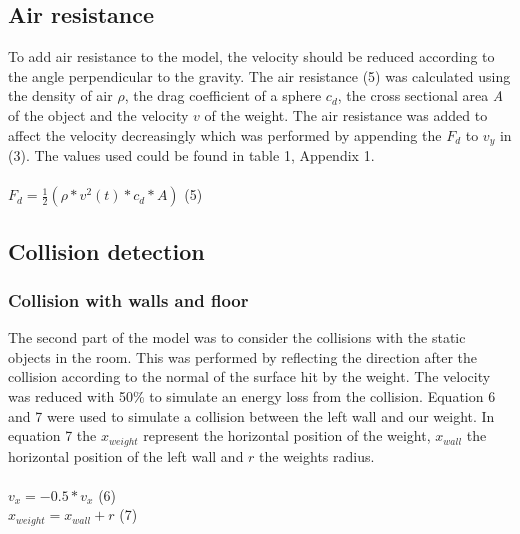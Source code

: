 \documentclass[a4paper,12pt,twoside,english]{article}
\begin{document}
 
\subsection{Air resistance}
To add air resistance to the model, the velocity should be reduced according to the angle perpendicular to the gravity. The air resistance (5) was calculated using the density of air ${\rho}$, the drag coefficient of a sphere $c_d$, the cross sectional area {\itshape A}  of the object and the velocity $v$ of the weight.
The air resistance was added to affect the velocity decreasingly which was performed by appending the $F_d$ to $v_y$ in (3). The values used  could be found in table 1, Appendix 1. \\ \\
$F_d = \frac{1}{2}( \rho * v^2(t) * c_{d} * A)$ \hfill (5) 

\subsection{Collision detection}
\subsubsection{Collision with walls and floor}
The second part of the model was to consider the collisions with the static objects in the room. This was performed by reflecting the direction after the collision according to the normal of the surface hit by the weight. The velocity was reduced with 50\%  to simulate an energy loss from the collision.  Equation 6 and 7 were used to simulate a collision between the left wall and our weight. In equation 7 the $x_{weight}$ represent the horizontal position of the weight, $x_{wall}$ the horizontal position of the left wall and $r$ the weights radius.  \\ \\
$v_x= -0.5*v_x$ \hfill (6) \\
$x_{weight} = x_{wall}+ r$ \hfill (7)
\end{document}
